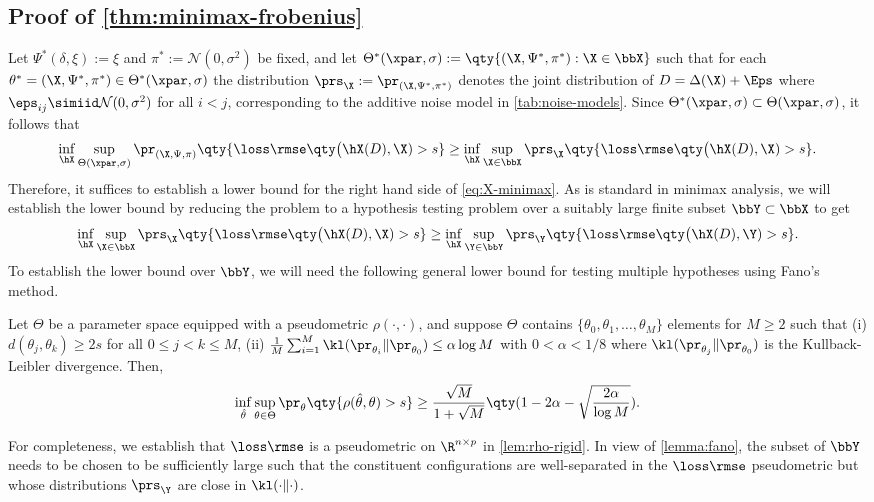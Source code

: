 \documentclass[10pt]{article}
\begin{document}
\subsection{Proof of \cref{thm:minimax-frobenius}}
\label{proof:thm:minimax-frobenius}

Let $\Psi^*(\delta, \xi) := \xi$ and $\pi^* := \mathcal{N}(0, \sigma^2)$ be fixed, and let $\Theta^*(\xpar, \sigma) := \qty{ (\X, \Psi^*, \pi^*): \X \in \bbX }$ such that for each $\theta^* = (\X, \Psi^*, \pi^*) \in \Theta^*(\xpar, \sigma)$ the distribution $\prs_\X := \pr_{(\X, \Psi^*, \pi^*)}$ denotes the joint distribution of $D = \Delta(\X) + \Eps$ where $\eps_{ij} \simiid \mathcal{N}(0, \sigma^2)$ for all $i < j$, corresponding to the additive noise model in \cref{tab:noise-models}. Since $\Theta^*(\xpar, \sigma) \subset \Theta(\xpar, \sigma)$, it follows that
\begin{align}
    \inf_{\hX}\sup_{\Theta(\xpar, \sigma)} \pr_{(\X, \Psi, \pi)}\qty{ \loss\rmse\qty\big(\hX(D), \X) > s} \ge \inf_{\hX}\sup_{\X \in \bbX} \prs_{\X}\qty{ \loss\rmse\qty\big(\hX(D), \X) > s}.\label{eq:X-minimax}
\end{align}
Therefore, it suffices to establish a lower bound for the right hand side of \cref{eq:X-minimax}. As is standard in minimax analysis, we will establish the lower bound by reducing the problem to a hypothesis testing problem over a suitably large finite subset $\bbY \subset \bbX$ to get
\begin{align}
    \inf_{\hX}\sup_{\X \in \bbX} \prs_{\X}\qty{ \loss\rmse\qty\big(\hX(D), \X) > s} \ge \inf_{\hX}\sup_{\Y \in \bbY} \prs_{\Y}\qty{ \loss\rmse\qty\big(\hX(D), \Y) > s}.\label{eq:Y-minimax}
\end{align}
To establish the lower bound over $\bbY$, we will need the following general lower bound for testing multiple hypotheses using Fano's method.

\begin{lemma}\label{lemma:fano}
    Let $\Theta$ be a parameter space equipped with a pseudometric $\rho(\cdot, \cdot)$, and suppose $\Theta$ contains $\{\theta_0, \theta_1, \dots, \theta_M\}$ elements for $M \ge 2$ such that (i) $d(\theta_j, \theta_k) \ge 2s$ for all $0 \le j < k \le M$, (ii) $\frac{1}{M}\sum_{i=1}^M \kl(\pr_{\theta_i} \| \pr_{\theta_0}) \le \alpha \log{M}$ with $0 < \alpha < 1/8$ where $\kl(\pr_{\theta_j} \| \pr_{\theta_0})$ is the Kullback-Leibler divergence. Then,
    \begin{align}
        \inf_{\hat\theta}\sup_{\theta\in\Theta} \pr_{\theta}\qty{ \rho(\hat\theta, \theta) > s } \ge \frac{\sqrt{M}}{1+\sqrt{M}}\qty( 1 - 2\alpha - \sqrt{\frac{2\alpha}{\log{M}}} ).
    \end{align}
\end{lemma}
For completeness, we establish that $\loss\rmse$ is a pseudometric on $\R^{n \times p}$ in \cref{lem:rho-rigid}. In view of \cref{lemma:fano}, the subset of $\bbY$ needs to be chosen to be sufficiently large such that the constituent configurations are well-separated in the $\loss\rmse$ pseudometric but whose distributions $\prs_{\Y}$ are close in $\kl(\cdot \| \cdot)$. 
\end{document}
